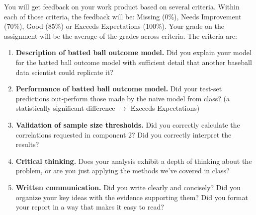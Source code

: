 \documentclass{article}
\begin{document}
      You will get feedback on your work product based on several criteria. Within each of those criteria, the feedback will be: Missing (0\%), Needs Improvement (70\%), Good (85\%) or Exceeds Expectations (100\%). Your grade on the assignment will be the average of the grades across criteria. The criteria are:
      \begin{enumerate}
        \item {\bf Description of batted ball outcome model.} Did you explain your model for the batted ball outcome model with sufficient detail that another baseball data scientist could replicate it?
        \item {\bf Performance of batted ball outcome model.} Did your test-set predictions out-perform those made by the naive model from class? (a statistically significant difference $\rightarrow$ Exceeds Expectations)
        \item {\bf Validation of sample size thresholds.} Did you correctly calculate the correlations requested in component 2? Did you correctly interpret the results?
        \item {\bf Critical thinking.} Does your analysis exhibit a depth of thinking about the problem, or are you just applying the methods we've covered in class?
        \item {\bf Written communication.} Did you write clearly and concisely? Did you organize your key ideas with the evidence supporting them? Did you format your report in a way that makes it easy to read?
      \end{enumerate}
\end{document}
